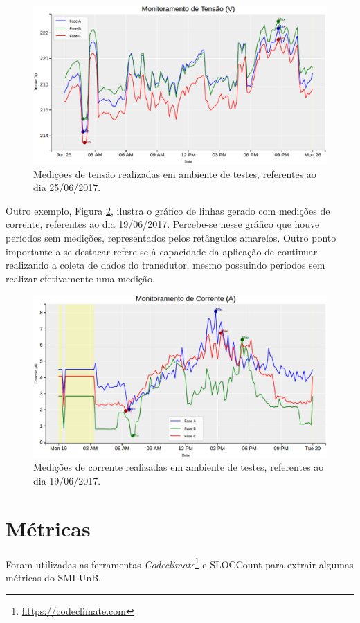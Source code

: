 \begin{figure}[!h]
    \centering
    \includegraphics[keepaspectratio=true,scale=0.5]{figuras/graph_1.eps}
    \caption{Medições de tensão realizadas em ambiente de testes, referentes ao dia 25/06/2017.}
    \label{graph_1}
\end{figure}

Outro exemplo, Figura \ref{graph_2}, ilustra o gráfico de linhas gerado com medições de corrente, referentes ao dia 19/06/2017. Percebe-se nesse gráfico que houve períodos sem medições, representados pelos retângulos amarelos. Outro ponto importante a se destacar refere-se à capacidade da aplicação de continuar realizando a coleta de dados do transdutor, mesmo possuindo períodos sem realizar efetivamente uma medição.

\begin{figure}[!h]
    \centering
    \includegraphics[keepaspectratio=true,scale=0.5]{figuras/graph_2.eps}
    \caption{Medições de corrente realizadas em ambiente de testes, referentes ao dia 19/06/2017.}
    \label{graph_2}
\end{figure}

\section{Métricas}
Foram utilizadas as ferramentas \textit{Codeclimate}\footnote{\url{https://codeclimate.com}} e SLOCCount \cite{sloccount} para extrair algumas métricas do SMI-UnB.

